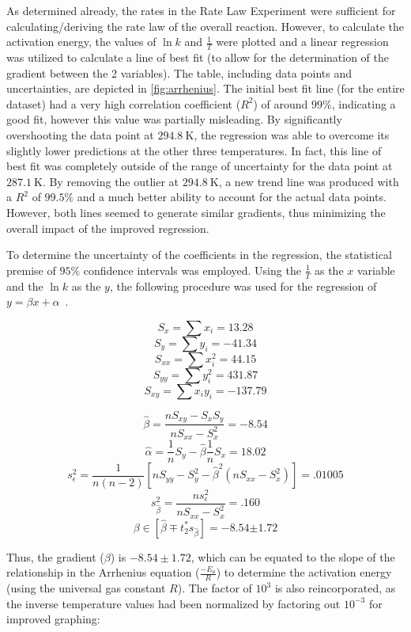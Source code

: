 As determined already, the rates in the Rate Law Experiment were sufficient for calculating/deriving the rate law of the overall reaction. However, to calculate the activation energy, the values of $\ln{k}$ and $\frac{1}{T}$ were plotted and a linear regression was utilized to calculate a line of best fit (to allow for the determination of the gradient between the 2 variables). The table, including data points and uncertainties, are depicted in \cref{fig:arrhenius}. The initial best fit line (for the entire dataset) had a very high correlation coefficient ($R^2$) of around $99\%$, indicating a good fit, however this value was partially misleading. By significantly overshooting the data point at $\SI{294.8}{\kelvin}$, the regression was able to overcome its slightly lower predictions at the other three temperatures. In fact, this line of best fit was completely outside of the range of uncertainty for the data point at $\SI{287.1}{\kelvin}$. By removing the outlier at $\SI{294.8}{\kelvin}$, a new trend line was produced with a $R^2$ of $99.5\%$ and a much better ability to account for the actual data points. However, both lines seemed to generate similar gradients, thus minimizing the overall impact of the improved regression.

To determine the uncertainty of the coefficients in the regression, the statistical premise of $95\%$ confidence intervals was employed. Using the $\frac{1}{T}$ as the $x$ variable and the $\ln{k}$ as the $y$, the following procedure was used for the regression of $y = \beta x + \alpha$~\parencite{regression_stat_book}.

 \begin{minipage}{.5\linewidth}
  $$S_x = \sum x_i = 13.28$$
  $$S_y = \sum y_i = -41.34$$
  $$S_{xx} = \sum x_i^2 = 44.15$$
  $$S_{yy} = \sum y_i^2 = 431.87$$
  $$S_{xy} = \sum x_iy_i = -137.79$$
 \end{minipage}
  \begin{minipage}{.5\linewidth}
  $$\hat{\beta} = \frac{nS_{xy} - S_xS_y}{nS_{xx} - S_x^2} = -8.54$$
  $$\hat{\alpha} = \frac{1}{n}S_y - \hat{\beta}\frac{1}{n}S_x =  18.02$$
  $$s_{\epsilon}^2 = \frac{1}{n(n-2)}\left[nS_{yy} - S_y^2 - \hat{\beta}^2(nS_{xx} - S_x^2)\right] = .01005$$
  $$s_{\hat{\beta}}^2 = \frac{ns_{\epsilon}^2}{nS_{xx} - S_x^2} = .160$$
  $$\beta \in [\hat{\beta} \mp t_{2}^*s_{\hat{\beta}}] = \bm{-8.54} \bm{\pm} \bm{1.72}$$
 \end{minipage}

 Thus, the gradient ($\beta$) is $-8.54 \pm 1.72$, which can be equated to the slope of the relationship in the Arrhenius equation ($\frac{-E_a}{R}$) to determine the activation energy (using the universal gas constant $R$). The factor of $10^3$ is also reincorporated, as the inverse temperature values had been normalized by factoring out $10^{-3}$ for improved graphing:

